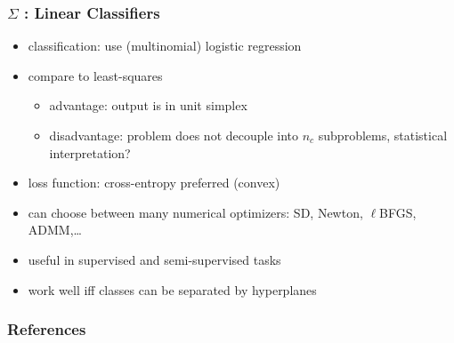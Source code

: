 \documentclass[12pt,fleqn,handout]{beamer}
\begin{document}
\begin{frame}
	\frametitle{$\Sigma$ : Linear Classifiers}
	
	\begin{itemize}
		\item classification: use (multinomial) logistic regression
		\item compare to least-squares
		\begin{itemize}
			\item advantage: output is in unit simplex
			\item disadvantage: problem does not decouple into $n_c$ subproblems, statistical interpretation?
		\end{itemize}
		\item loss function: cross-entropy preferred (convex)
		\item can choose between many numerical optimizers: SD, Newton, $\ell$BFGS, ADMM,\ldots
		\item useful in supervised and semi-supervised tasks
		\item work well iff classes can be separated by hyperplanes
	\end{itemize}
\end{frame}

\begin{frame}[allowframebreaks]
	\frametitle{References}



\end{frame}
\end{document}
